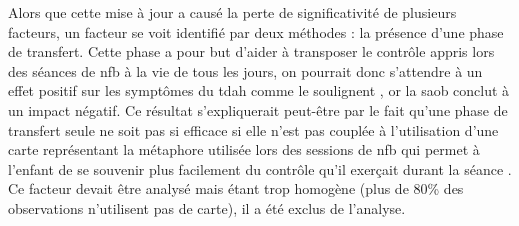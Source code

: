 Alors que cette mise à jour a causé la perte de significativité de plusieurs facteurs, un facteur se voit identifié par deux méthodes : la présence d'une phase de transfert. 
Cette phase a pour but d'aider à transposer le contrôle appris lors des séances de \gls{nfb} à la vie de tous les jours, on pourrait donc s'attendre à un effet positif sur les symptômes
du \gls{tdah} comme le soulignent \citet{Arns2014, Strehl2006, Gani2008}, or la \gls{saob} conclut à un impact négatif. Ce résultat s'expliquerait peut-être par le fait qu'une phase de 
transfert seule ne soit pas si efficace si elle n'est pas couplée à l'utilisation d'une carte représentant la métaphore utilisée lors des sessions de \gls{nfb} qui permet à l'enfant de se 
souvenir plus facilement du contrôle qu'il exerçait durant la séance \citep{Bioulac2019, Bluschke2016}. Ce facteur devait être analysé mais étant trop homogène (plus de 80\% des observations n'utilisent pas de carte), il 
a été exclus de l'analyse. 

%
%

